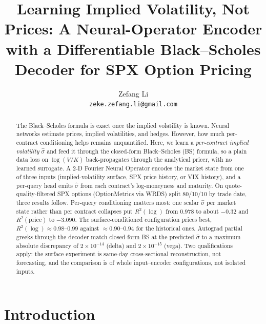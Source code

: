 \documentclass[11pt]{article}
\title{Learning Implied Volatility, Not Prices: A Neural-Operator Encoder\\
with a Differentiable Black--Scholes Decoder for SPX Option Pricing}
\author{
Zefang Li \\
\small \texttt{zeke.zefang.li@gmail.com}
}
\date{}
\begin{document}
\maketitle

\begin{abstract}
The Black--Scholes formula is exact once the implied volatility is known. Neural networks estimate
prices, implied volatilities, and hedges. However, how much per-contract conditioning helps remains
unquantified. Here, we learn a \emph{per-contract implied volatility} $\hat\sigma$ and feed it through the closed-form
Black--Scholes (BS) formula, so a plain data loss on $\log(V/K)$ back-propagates through the
analytical pricer, with no learned surrogate. A 2-D Fourier Neural Operator encodes the market state
from one of three inputs (implied-volatility surface, SPX price history, or VIX history), and a
per-query head emits $\hat\sigma$ from each contract's log-moneyness and maturity. On
quote-quality-filtered SPX options (OptionMetrics via WRDS) split 80/10/10 by trade date, three
results follow. Per-query conditioning matters most: one scalar $\hat\sigma$ per market
state rather than per contract collapses put $R^2(\log)$ from 0.978 to about $-0.32$ and
$R^2(\text{price})$ to $-3.090$. The surface-conditioned configuration prices best, $R^2(\log) \approx
0.98$--$0.99$ against $\approx 0.90$--$0.94$ for the historical ones. Autograd partial greeks through
the decoder match closed-form BS at the predicted $\hat\sigma$ to a maximum absolute discrepancy of
$2\times10^{-14}$ (delta) and $2\times10^{-15}$ (vega). Two qualifications apply: the surface
experiment is same-day cross-sectional reconstruction, not forecasting, and the comparison is of whole
input--encoder configurations, not isolated inputs.
\end{abstract}

\section{Introduction}
\label{sec:intro}
\end{document}
